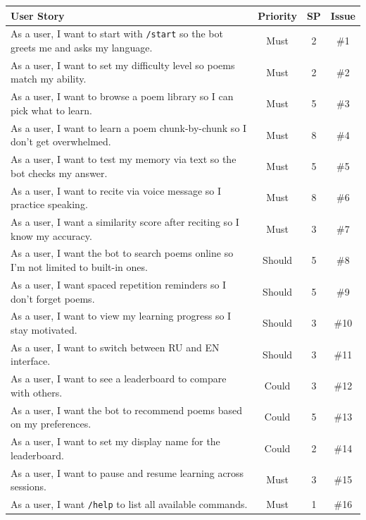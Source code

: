 \documentclass[11pt, a4paper]{article}
\begin{document}
\begin{center}
\footnotesize
\begin{longtable}{|p{}|c|c|c|}
\hline
\textbf{User Story} & \textbf{Priority} & \textbf{SP} & \textbf{Issue} \\
\hline
\endhead
As a user, I want to start with \texttt{/start} so the bot greets me and asks my language. & Must & 2 & \#1 \\
\hline
As a user, I want to set my difficulty level so poems match my ability. & Must & 2 & \#2 \\
\hline
As a user, I want to browse a poem library so I can pick what to learn. & Must & 5 & \#3 \\
\hline
As a user, I want to learn a poem chunk-by-chunk so I don't get overwhelmed. & Must & 8 & \#4 \\
\hline
As a user, I want to test my memory via text so the bot checks my answer. & Must & 5 & \#5 \\
\hline
As a user, I want to recite via voice message so I practice speaking. & Must & 8 & \#6 \\
\hline
As a user, I want a similarity score after reciting so I know my accuracy. & Must & 3 & \#7 \\
\hline
As a user, I want the bot to search poems online so I'm not limited to built-in ones. & Should & 5 & \#8 \\
\hline
As a user, I want spaced repetition reminders so I don't forget poems. & Should & 5 & \#9 \\
\hline
As a user, I want to view my learning progress so I stay motivated. & Should & 3 & \#10 \\
\hline
As a user, I want to switch between RU and EN interface. & Should & 3 & \#11 \\
\hline
As a user, I want to see a leaderboard to compare with others. & Could & 3 & \#12 \\
\hline
As a user, I want the bot to recommend poems based on my preferences. & Could & 5 & \#13 \\
\hline
As a user, I want to set my display name for the leaderboard. & Could & 2 & \#14 \\
\hline
As a user, I want to pause and resume learning across sessions. & Must & 3 & \#15 \\
\hline
As a user, I want \texttt{/help} to list all available commands. & Must & 1 & \#16 \\
\hline
\end{longtable}
\end{center}
\end{document}
